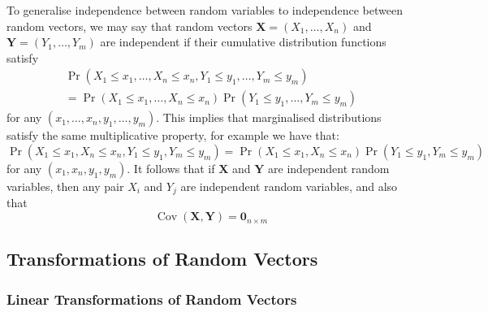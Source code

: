 \documentclass[11pt]{report} %
\begin{document}
To generalise independence between random variables to independence between random vectors, we may say that random vectors $\mathbf{X} = \left(X_{1}, \dots, X_{n}\right)$ and $\mathbf{Y} = \left(Y_{1}, \dots, Y_{m}\right)$ are independent if their cumulative distribution functions satisfy
\begin{multline}
\operatorname{Pr}\left(X_{1} \leq x_{1}, \dots, X_{n} \leq x_{n}, Y_{1} \leq y_{1}, \dots, Y_{m} \leq y_{m}\right) \\
= \operatorname{Pr}\left(X_{1} \leq x_{1}, \dots, X_{n} \leq x_{n}\right)\operatorname{Pr}\left(Y_{1} \leq y_{1}, \dots, Y_{m} \leq y_{m}\right)
\end{multline}
for any $\left(x_{1}, \dots, x_{n}, y_{1}, \dots, y_{m}\right)$. This implies that marginalised distributions satisfy the same multiplicative property, for example we have that:
\begin{equation}
\operatorname{Pr}\left(X_{1} \leq x_{1}, X_{n} \leq x_{n}, Y_{1} \leq y_{1}, Y_{m} \leq y_{m}\right) = \operatorname{Pr}\left(X_{1} \leq x_{1}, X_{n} \leq x_{n}\right)\operatorname{Pr}\left(Y_{1} \leq y_{1}, Y_{m} \leq y_{m}\right)
\end{equation}
for any $\left(x_{1}, x_{n}, y_{1}, y_{m}\right)$. It follows that if $\mathbf{X}$ and $\mathbf{Y}$ are independent random variables, then any pair $X_{i}$ and $Y_{j}$ are independent random variables, and also that
\begin{equation}
\operatorname{Cov}\left(\mathbf{X}, \mathbf{Y}\right) = \mathbf{0}_{n \times m}
\end{equation}

\subsection{Transformations of Random Vectors}

\subsubsection{Linear Transformations of Random Vectors}
\end{document}
